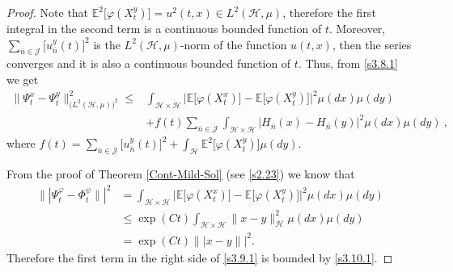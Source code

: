 \documentclass[]{interact}
\newcommand{\E}{\mathbb{E}}
\theoremstyle{plain}%
\theoremstyle{definition}
\theoremstyle{remark}
\begin{document}
\begin{proof}
            Note that
        $\E^2\big[\varphi(X_t^y)\big]=u^2(t,x)\in L^2(\mathcal{H},\mu)$,
        therefore the first integral in the second term is a continuous bounded
        function of $t$. Moreover,
        $\sum_{\bar n\in \mathcal{J}} \big[u_{\bar n}^y(t)\big]^2$ is the
        $L^2(\mathcal{H},\mu)$-norm of the function $u(t,x)$, then the series
        converges and it is also a continuous bounded function of $t$. Thus, 
        from
        \eqref{s3.8.1} we get
        \begin{equation}
        \label{s3.9.1}
            \begin{aligned}
                \| \Psi_t^x-\Psi_t^y\|_{\big(L^2(\mathcal{H},\mu) \big)^2}^2
                \le&
                \int_{\mathcal{H}\times \mathcal{H}}
                    \Big|
                        \E\big [
                            \varphi(X_t^x)
                        \big
                        ]-
                        \E\big[
                            \varphi(X_t^y)
                        \big]
                    \Big|^2
                \mu(dx)\mu(dy)
                \\
                 &+
                 f(t)
                 \sum_{\bar n\in \mathcal{J}}
                 \int_{\mathcal{H}\times \mathcal{H}}
                    \big|
                        H_{\bar n}(x) - H_{\bar n}(y)
                    \big|^2 \mu(dx)\mu(dy) \ ,
            \end{aligned}
        \end{equation}
        where $f(t)= \sum_{\bar n\in \mathcal{J}} \big[u_{\bar n}^y(t)\big]^2+ 
        \int_\mathcal{H}
                    \E ^ 2\big[
                        \varphi(X_t^y)
                    \big] \mu(dy)
                    $.
        
        From the proof of Theorem \ref{Cont-Mild-Sol} (see \eqref{s2.23}) we 
        know that
        \begin{equation}
            \begin{aligned}
                \| | \Psi_t^\varphi-\Phi_t^\psi\| |^2
                    &=\int_{\mathcal{H}\times \mathcal{H}}
                    \Big|
                        \E\big [
                            \varphi(X_t^x)
                        \big]
                        -
                        \E\big[
                            \varphi(X_t^y)
                        \big]
                    \Big|^2
                    \mu(dx)
                    \mu(dy)
                    \\
                    &\le
                    \exp(Ct)
                    \int_{\mathcal{H}\times \mathcal{H}}
                        \|x-y\|_{\mathcal{H}}^2
                        \mu(dx)\mu(dy)
                    \\
                    &= \exp(Ct) \|  |x-y\| |^2.\label{s3.10.1}
            \end{aligned}
        \end{equation}
        Therefore the first term in the right side of \eqref{s3.9.1} is bounded 
        by
        \eqref{s3.10.1}.
        

\end{proof}
\end{document}

